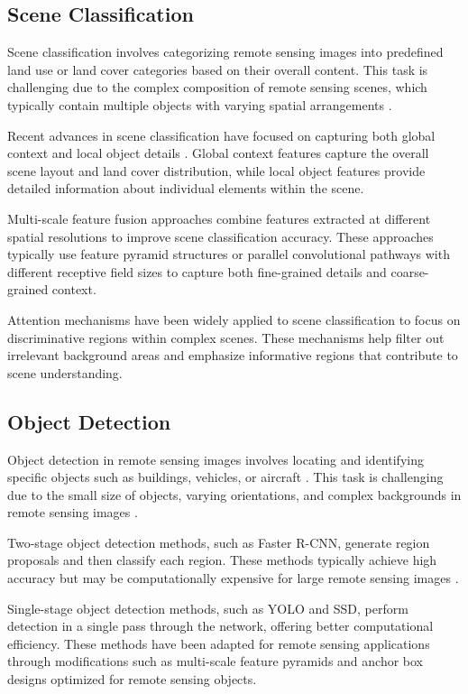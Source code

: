 \documentclass[12pt,a4paper]{article}
\begin{document}
\subsection{Scene Classification}
Scene classification involves categorizing remote sensing images into predefined land use or land cover categories based on their overall content. This task is challenging due to the complex composition of remote sensing scenes, which typically contain multiple objects with varying spatial arrangements \cite{xia2017aid}.

Recent advances in scene classification have focused on capturing both global context and local object details \cite{zeng2018improving}. Global context features capture the overall scene layout and land cover distribution, while local object features provide detailed information about individual elements within the scene.

Multi-scale feature fusion approaches combine features extracted at different spatial resolutions to improve scene classification accuracy. These approaches typically use feature pyramid structures or parallel convolutional pathways with different receptive field sizes to capture both fine-grained details and coarse-grained context.

Attention mechanisms have been widely applied to scene classification to focus on discriminative regions within complex scenes. These mechanisms help filter out irrelevant background areas and emphasize informative regions that contribute to scene understanding.

\subsection{Object Detection}
Object detection in remote sensing images involves locating and identifying specific objects such as buildings, vehicles, or aircraft \cite{cheng2016survey}. This task is challenging due to the small size of objects, varying orientations, and complex backgrounds in remote sensing images \cite{zhang2016weakly}.

Two-stage object detection methods, such as Faster R-CNN, generate region proposals and then classify each region. These methods typically achieve high accuracy but may be computationally expensive for large remote sensing images \cite{deng2017enhanced}.

Single-stage object detection methods, such as YOLO and SSD, perform detection in a single pass through the network, offering better computational efficiency. These methods have been adapted for remote sensing applications through modifications such as multi-scale feature pyramids and anchor box designs optimized for remote sensing objects.
\end{document}
